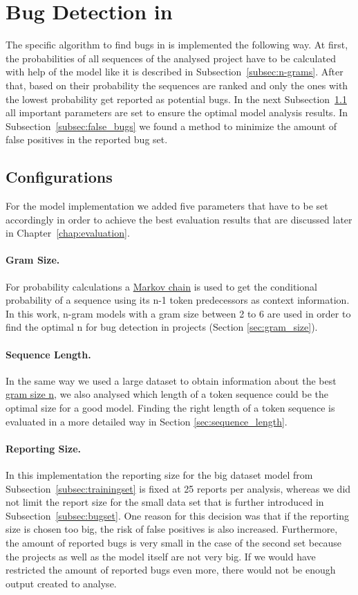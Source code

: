 \section{Bug Detection in \scratch{}}\label{sec:detection}
The specific algorithm to find bugs in \scratch{} is implemented the following way. At first, the probabilities of all sequences of the analysed project have to be calculated with help of the model like it is described in Subsection~\ref{subsec:n-grams}. After that, based on their probability the sequences are ranked and only the ones with the lowest probability get reported as potential bugs. In the next Subsection~\ref{subsec:configurations} all important parameters are set to ensure the optimal model analysis results. In Subsection~\ref{subsec:false_bugs} we found a method to minimize the amount of false positives in the reported bug set.

\subsection{Configurations}\label{subsec:configurations}
For the \scratch{} model implementation we added five parameters that have to be set accordingly in order to achieve the best evaluation results that are discussed later in Chapter~\ref{chap:evaluation}.

\paragraph{Gram Size.}
For probability calculations a \hyperref[def:markov_chain]{Markov chain} is used to get the conditional probability of a sequence using its n-1 token predecessors as context information. In this work, n-gram models with a gram size between 2 to 6 are used in order to find the optimal n for bug detection in \scratch{} projects (Section \ref{sec:gram_size}). 
\paragraph{Sequence Length.}
In the same way we used a large dataset to obtain information about the best \hyperref[def:gram_size]{gram size n}, we also analysed which length of a token sequence could be the optimal size for a good model. Finding the right length of a token sequence is evaluated in a more detailed way in Section \ref{sec:sequence_length}.
\paragraph{Reporting Size.}
In this implementation the reporting size for the big dataset model from Subsection~\ref{subsec:trainingset} is fixed at 25 reports per analysis, whereas we did not limit the report size for the small data set that  is further introduced in Subsection~\ref{subsec:bugset}. One reason for this decision was that if the reporting size is chosen too big, the risk of false positives is also increased. Furthermore, the amount of reported bugs is very small in the case of the second set because the projects as well as the model itself are not very big. If we would have restricted the amount of reported bugs even more, there would not be enough output created to analyse.  
